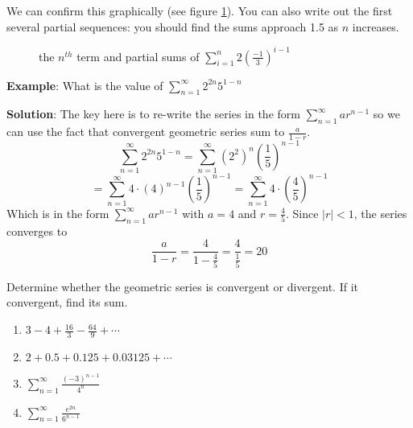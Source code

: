 We can confirm this graphically (see figure \ref{fig:geometric}). You 
can also write out the first several partial sequences: you should 
find the sums approach 1.5 as $n$ increases.

\begin{figure}[htbp]
\centering
    \caption{the $n^{th}$ term and partial sums of $\sum_{i=1}^n 
    2(\frac{-1}{3})^{i-1}$}
    \label{fig:geometric}
\end{figure}

\textbf{Example}: What is the value of $\sum_{n=1}^\infty 2^{2n}5^{1-n}$

\textbf{Solution}: The key here is to re-write the series in the form $\sum_
{n=1}^\infty ar^{n -1}$ so we can use the fact that convergent geometric 
series sum to $\frac{a}{1-r}$. 
$$\sum_{n=1}^\infty 2^{2n}5^{1-n} = \sum_{n=1}^\infty \left( 2^2 \right)^n 
\left( \frac{1}{5} \right)^{n-1}$$
$$= \sum_{n=1}^\infty 4 \cdot \left( 4 \right)^{n-1} \left( \frac{1}{5} 
\right)^{n-1} = \sum_{n=1}^\infty 4 \cdot \left( \frac{4}{5} \right)^{n-1}$$
Which is in the form $\sum_{n=1}^\infty ar^{n -1}$ with $a=4$ and $r=
\frac{4}{5}$. Since $|r| < 1$, the series converges to 
$$\frac{a}{1-r} = \frac{4}{1-\frac{4}{5}} = \frac{4}{\frac{1}{5}} = 20$$

\begin{Exercise}[label=geo1]
Determine whether the geometric series is convergent or divergent. If it 
convergent, find its sum.
\begin{enumerate}
\item $3 - 4 + \frac{16}{3} - \frac{64}{9} + \cdots$
\item $2 + 0.5 + 0.125 + 0.03125 + \cdots$
\item $\sum_{n=1}^\infty \frac{(-3)^{n-1}}{4^n}$
\item $\sum_{n=1}^\infty \frac{e^{2n}}{6^{n-1}}$
\end{enumerate}
\end{Exercise}

